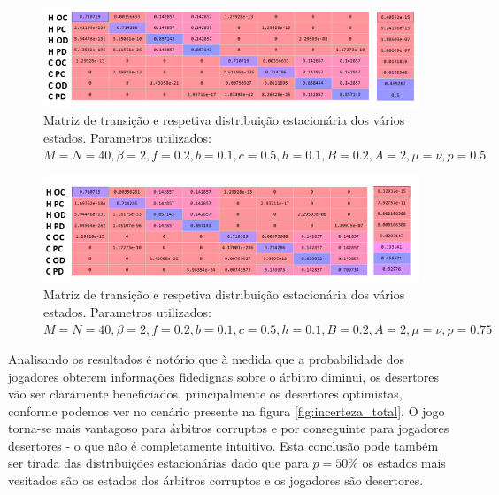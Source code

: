 \documentclass[conference, twocolumn]{IEEEtran}
\theoremstyle{plain}
\theoremstyle{definition}
\theoremstyle{remark}
\begin{document}
    \begin{figure}[h]
        \centering
        \includegraphics[width=1\linewidth]{images/SEGUNDA_P_0_5.PNG}
        \caption{\small Matriz de transição e respetiva distribuição estacionária dos vários estados. Parametros utilizados: $M=N=40, \beta=2, f=0.2, b=0.1, c=0.5, h=0.1, B=0.2,A=2, \mu=\nu, p=0.5$}
        \label{fig:segunda}
    \end{figure}

    \begin{figure}[h]
        \centering
        \includegraphics[width=1\linewidth]{images/terceira_0_75.PNG}
        \caption{\small Matriz de transição e respetiva distribuição estacionária dos vários estados. Parametros utilizados: $M=N=40, \beta=2, f=0.2, b=0.1, c=0.5, h=0.1, B=0.2,A=2, \mu=\nu, p=0.75$ }
        \label{fig:terceira}
    \end{figure}

    Analisando os resultados é notório que à medida que a probabilidade dos jogadores obterem informações fidedignas sobre o árbitro diminui, os desertores vão ser claramente beneficiados, principalmente os desertores optimistas, conforme podemos ver no cenário presente na figura \ref{fig:incerteza_total}. O jogo torna-se mais vantagoso para árbitros corruptos e por conseguinte para jogadores desertores - o que não é completamente intuitivo. Esta conclusão pode também ser tirada das distribuições estacionárias dado que para $p=50\%$ os estados mais vesitados são os estados dos árbitros corruptos e os jogadores são desertores.
\end{document}
